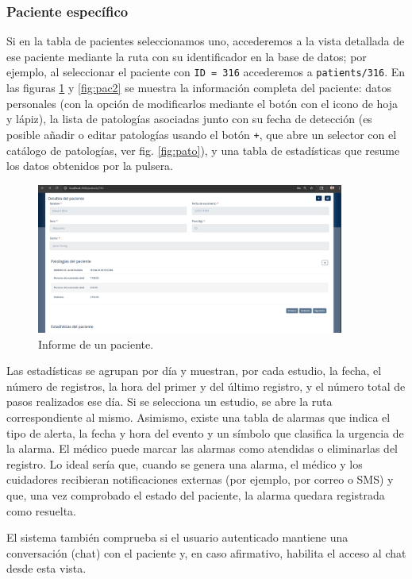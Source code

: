 \documentclass[12pt, a4paper]{article}
\begin{document}
\begin{umaappendices}
		\subsubsection{Paciente específico}
		Si en la tabla de pacientes seleccionamos uno, accederemos a la vista detallada de ese paciente mediante la ruta con su identificador en la base de datos; por ejemplo, al seleccionar el paciente con \texttt{ID = 316} accederemos a \texttt{patients/316}. En las figuras \ref{fig:pac1} y \ref{fig:pac2} se muestra la información completa del paciente: datos personales (con la opción de modificarlos mediante el botón con el icono de hoja y lápiz), la lista de patologías asociadas junto con su fecha de detección (es posible añadir o editar patologías usando el botón \texttt{+}, que abre un selector con el catálogo de patologías, ver fig. \ref{fig:pato}), y una tabla de estadísticas que resume los datos obtenidos por la pulsera.
		
		\begin{figure}[htbp]
			\centering
			\includegraphics[width=0.9\textwidth]{images/6_patientID.png}
			\caption[Ejemplo]{Informe de un paciente.}
			\label{fig:pac1}
		\end{figure}
		Las estadísticas se agrupan por día y muestran, por cada estudio, la fecha, el número de registros, la hora del primer y del último registro, y el número total de pasos realizados ese día. Si se selecciona un estudio, se abre la ruta correspondiente al mismo. Asimismo, existe una tabla de alarmas que indica el tipo de alerta, la fecha y hora del evento y un símbolo que clasifica la urgencia de la alarma. El médico puede marcar las alarmas como atendidas o eliminarlas del registro. Lo ideal sería que, cuando se genera una alarma, el médico y los cuidadores recibieran notificaciones externas (por ejemplo, por correo o SMS) y que, una vez comprobado el estado del paciente, la alarma quedara registrada como resuelta.
		
		El sistema también comprueba si el usuario autenticado mantiene una conversación (chat) con el paciente y, en caso afirmativo, habilita el acceso al chat desde esta vista.
		

\end{umaappendices}
\end{document}
